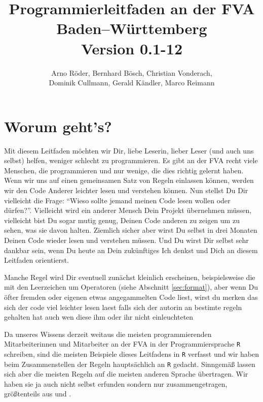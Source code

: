 \documentclass[twoside]{scrartcl}
\providecommand{\R}{\texttt{R}}
\begin{document}
\title{Programmierleitfaden an der FVA Baden--W\"u{}rttemberg\\
\vspace{1cm}
\normalsize{Version 0.1-12}}
\author{Arno R\"oder, Bernhard B\"o{}sch, Christian Vonderach,\\
Dominik Cullmann, Gerald K\"a{}ndler, Marco Reimann}
\maketitle
\tableofcontents
\thispagestyle{fancy}
\section{Worum geht's?}
Mit diesem Leitfaden m\"o{}chten wir Dir, liebe Leserin, lieber Leser (und auch
uns selbst) helfen, weniger schlecht zu programmieren.
Es gibt an der FVA recht viele Menschen, die programmieren und nur wenige, die
dies richtig gelernt haben. Wenn wir uns auf einen gemeinsamen Satz von Regeln
einlassen k\"o{}nnen, werden wir den Code Anderer leichter lesen und verstehen
k\"o{}nnen.
Nun stellst Du Dir vielleicht die Frage: "`Wieso sollte jemand meinen Code lesen
wollen oder d\"u{}rfen?"'. Vielleicht wird ein anderer Mensch Dein Projekt
\"u{}bernehmen m\"u{}ssen, vielleicht bist Du sogar mutig genug, Deinen Code
anderen zu zeigen um zu sehen, was sie davon halten. Ziemlich sicher aber wirst
Du selbst in drei Monaten Deinen Code wieder lesen und verstehen m\"u{}ssen. Und
Du wirst Dir selbst sehr dankbar sein, wenn Du heute an Dein zuk\"u{}nftiges
Ich denkst und Dich an diesem Leitfaden orientierst.

Manche Regel wird Dir eventuell zun\"a{}chst kleinlich erscheinen,
beispielsweise die mit den Leerzeichen  um  Operatoren (siehe Abschnitt
\ref{sec:format}), aber wenn Du \"o{}fter fremden oder eigenen etwas
angegammelten Code liest, wirst
du merken das sich der code viel leichter lesen laest falls sich der autorin  an
bestimte regeln gehalten hat auch wen diese ihm oder ihr nicht einleuchteten

Da unseres Wissens derzeit weitaus die meisten programmierenden Mitarbeiterinnen
und Mitarbeiter an der FVA in der Programmiersprache \R{} schreiben, sind die
meisten Beispiele dieses Leitfadens in \R{} verfasst und wir haben beim
Zusammenstellen der Regeln haupts\"a{}chlich an \R{} gedacht.
Sinngem\"a{}\ss{} lassen sich aber die meisten Regeln auf die meisten
anderen Sprache \"u{}bertragen. Wir haben sie ja auch nicht selbst erfunden
sondern nur zusammengetragen, gr\"o{}\ss{}tenteils aus \cite{cc} und \cite{wsp}.
\end{document}
